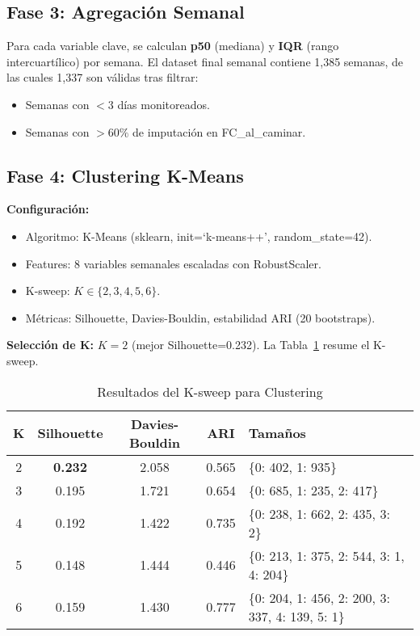 \documentclass[12pt,a4paper,twoside]{article}
\begin{document}
\subsection{Fase 3: Agregación Semanal}

Para cada variable clave, se calculan \textbf{p50} (mediana) y \textbf{IQR} (rango intercuartílico) por semana. El dataset final semanal contiene 1,385 semanas, de las cuales 1,337 son válidas tras filtrar:
\begin{itemize}
    \item Semanas con $<3$ días monitoreados.
    \item Semanas con $>60\%$ de imputación en FC\_al\_caminar.
\end{itemize}

\subsection{Fase 4: Clustering K-Means}

\textbf{Configuración:}
\begin{itemize}
    \item Algoritmo: K-Means (sklearn, init=`k-means++', random\_state=42).
    \item Features: 8 variables semanales escaladas con RobustScaler.
    \item K-sweep: $K \in \{2, 3, 4, 5, 6\}$.
    \item Métricas: Silhouette, Davies-Bouldin, estabilidad ARI (20 bootstraps).
\end{itemize}

\textbf{Selección de K:} $K=2$ (mejor Silhouette=0.232). La Tabla~\ref{tab:k_sweep} resume el K-sweep.

\begin{table}[h]
\centering
\caption{Resultados del K-sweep para Clustering}
\label{tab:k_sweep}
\small
\begin{tabular}{ccccl}
\toprule
\textbf{K} & \textbf{Silhouette} & \textbf{Davies-Bouldin} & \textbf{ARI} & \textbf{Tamaños} \\
\midrule
2 & \textbf{0.232} & 2.058 & 0.565 & \{0: 402, 1: 935\} \\
3 & 0.195 & 1.721 & 0.654 & \{0: 685, 1: 235, 2: 417\} \\
4 & 0.192 & 1.422 & 0.735 & \{0: 238, 1: 662, 2: 435, 3: 2\} \\
5 & 0.148 & 1.444 & 0.446 & \{0: 213, 1: 375, 2: 544, 3: 1, 4: 204\} \\
6 & 0.159 & 1.430 & 0.777 & \{0: 204, 1: 456, 2: 200, 3: 337, 4: 139, 5: 1\} \\
\bottomrule
\end{tabular}
\end{table}
\end{document}

